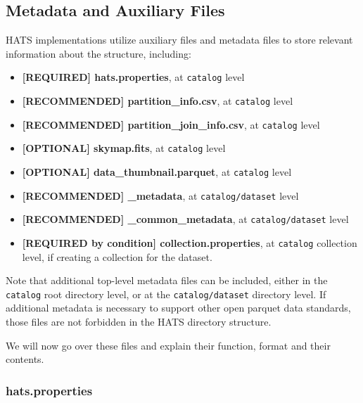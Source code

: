 \documentclass[11pt,a4paper]{ivoa}
\begin{document}

\subsection{Metadata and Auxiliary Files} \label{sec:meta}
HATS implementations utilize auxiliary files and metadata files to store relevant information about the  structure, including:
\begin{itemize}
    \item \textbf{[REQUIRED] hats.properties}, at  \texttt{catalog} level    
    \item \textbf{[RECOMMENDED] partition\_info.csv}, at  \texttt{catalog} level
    \item \textbf{[RECOMMENDED] partition\_join\_info.csv}, at  \texttt{catalog} level
    \item \textbf{[OPTIONAL] skymap.fits}, at  \texttt{catalog} level
    \item \textbf{[OPTIONAL] data\_thumbnail.parquet}, at  \texttt{catalog} level
    \item \textbf{[RECOMMENDED] \_metadata}, at  \texttt{catalog/dataset} level
    \item \textbf{[RECOMMENDED] \_common\_metadata}, at  \texttt{catalog/dataset} level
    \item \textbf{[REQUIRED by condition] collection.properties}, at  \texttt{catalog} collection level, if creating a collection for the dataset.
\end{itemize}

Note that additional top-level metadata files
can be included, either in the \texttt{catalog} root directory level, or at the \texttt{catalog/dataset} directory
level. If additional metadata is necessary to support other open parquet data standards, those files are not 
forbidden in the HATS directory structure.\par 

We will now go over these files and explain their function, format and their contents. 
    
\subsubsection{hats.properties} 
\end{document}
